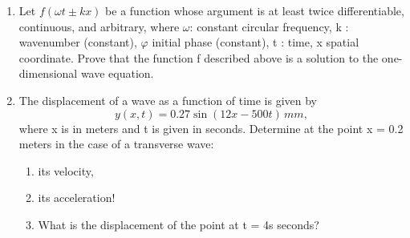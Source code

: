 \documentclass[a4paper,12pt]{letter}
\begin{document}
\begin{enumerate}

\item Let $f(\omega t \pm kx)$ be a function whose argument is at least twice differentiable, continuous, and arbitrary, where $\omega$: constant circular frequency, k : wavenumber (constant), $\varphi$ initial phase (constant), t : time, x spatial coordinate. Prove that the function f described above is a solution to the one-dimensional wave equation.


\item The displacement of a wave as a function of time is given by $$y(x,t) = 0.27 \sin(12x - 500t)\,mm,$$ where x is in meters and t is given in seconds. Determine at the point x = 0.2 meters in the case of a transverse wave:
\begin{enumerate}
\item[a)] its velocity,
\item[b)] its acceleration!
\item[c)] What is the displacement of the point at t = 4s seconds?
\end{enumerate}
  

\end{enumerate}

\bigskip


\vfill
\end{document}
